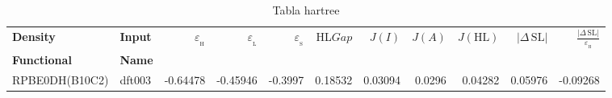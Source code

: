 \documentclass[preprint,landscape,12pt]{elsarticle}
\begin{document}
	\begin{table}
		\caption{ Tabla hartree}
		\centering
		\footnotesize
		\begin{tabular}{llrrrrrrrrr}
			\hline
			\textbf{Density} & \textbf{Input} &$\varepsilon_{_{\mathrm{H}}}$	& $\varepsilon_{_{\mathrm{L}}}$  & $\varepsilon_{_{\mathrm{S}}}$& HL$Gap$ & $J(I)$ & $J(A)$ & $J(\mathrm{HL})$  & \textbf{$\left|\Delta\,\mathrm{SL}\right|$} & $\frac{\left|\Delta\,\mathrm{SL}\right|}{\varepsilon_{_{\mathrm{H}}}}$ \\
			\textbf{Functional} & \textbf{Name}&   &  &     &   &  &  &  &  &\\
			\hline \hline 

RPBE0DH(B10C2) & dft003 & -0.64478 & -0.45946 & -0.3997 & 0.18532 & 0.03094 & 0.0296 & 0.04282 & 0.05976 & -0.09268\\

	 		\hline
		\end{tabular}
			\label{tab:hartree}
	\end{table}
\end{document}

